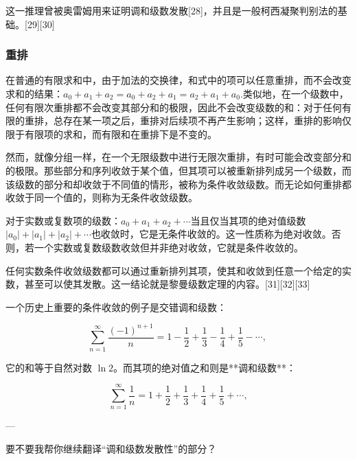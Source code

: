 这一推理曾被奥雷姆用来证明调和级数发散[28]，并且是一般柯西凝聚判别法的基础。[29][30]
\subsubsection{重排}
在普通的有限求和中，由于加法的交换律，和式中的项可以任意重排，而不会改变求和的结果：$a_{0} + a_{1} + a_{2} = a_{0} + a_{2} + a_{1} = a_{2} + a_{1} + a_{0}$.类似地，在一个级数中，任何有限次重排都不会改变其部分和的极限，因此不会改变级数的和：对于任何有限的重排，总存在某一项之后，重排对后续项不再产生影响；这样，重排的影响仅限于有限项的求和，而有限和在重排下是不变的。

然而，就像分组一样，在一个无限级数中进行无限次重排，有时可能会改变部分和的极限。那些部分和序列收敛于某个值，但其项可以被重新排列成另一个级数，而该级数的部分和却收敛于不同值的情形，被称为条件收敛级数。而无论如何重排都收敛于同一个值的，则称为无条件收敛级数。

对于实数或复数项的级数：$a_{0} + a_{1} + a_{2} + \cdots$当且仅当其项的绝对值级数$|a_{0}| + |a_{1}| + |a_{2}| + \cdots$也收敛时，它是无条件收敛的。这一性质称为绝对收敛。否则，若一个实数或复数级数收敛但并非绝对收敛，它就是条件收敛的。

任何实数条件收敛级数都可以通过重新排列其项，使其和收敛到任意一个给定的实数，甚至可以使其发散。这一结论就是黎曼级数定理的内容。[31][32][33]

一个历史上重要的条件收敛的例子是交错调和级数：

$$
\sum_{n=1}^{\infty} \frac{(-1)^{n+1}}{n} 
= 1 - \frac{1}{2} + \frac{1}{3} - \frac{1}{4} + \frac{1}{5} - \cdots ,~
$$

它的和等于自然对数 $\ln 2$。而其项的绝对值之和则是**调和级数**：

$$
\sum_{n=1}^{\infty} \frac{1}{n} 
= 1 + \frac{1}{2} + \frac{1}{3} + \frac{1}{4} + \frac{1}{5} + \cdots ,
$$

---

要不要我帮你继续翻译“调和级数发散性”的部分？
